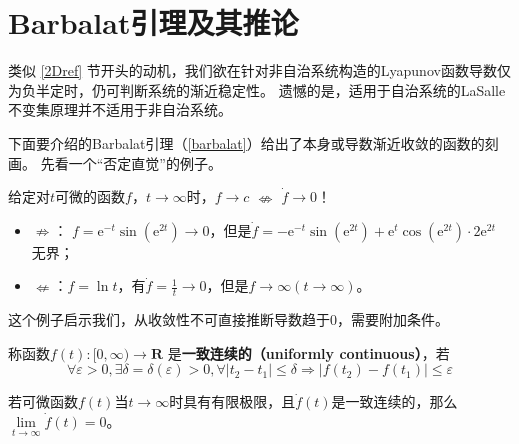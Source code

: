 \section{Barbalat引理及其推论}\label{3Eref}
类似 \ref{2Dref} 节开头的动机，我们欲在针对非自治系统构造的Lyapunov函数导数仅为负半定时，仍可判断系统的渐近稳定性。
遗憾的是，适用于自治系统的LaSalle不变集原理并不适用于非自治系统。

下面要介绍的Barbalat引理（\ref{barbalat}）给出了本身或导数渐近收敛的函数的刻画。
先看一个“否定直觉”的例子。
\begin{example}
    给定对$t$可微的函数$f$，$t \rightarrow \infty$时，$f\to c$  $\nLeftrightarrow $ $\dot{f} \rightarrow 0$！
  \begin{itemize}[leftmargin=1em]
    \item $\nRightarrow $： $f = \mathrm{e}^{- t} \sin (\mathrm{e}^{2 t}) \rightarrow 0$，但是$ \dot{f} = - \mathrm{e}^{- t} \sin
    (\mathrm{e}^{2 t}) + \mathrm{e}^t \cos (\mathrm{e}^{2 t}) \cdot 2 \mathrm{e}^{2 t}$ 无界；    
    \item $\nLeftarrow $：$f = \ln  t$，有$ \dot{f} = \frac{1}{t} \rightarrow0$，但是$f \rightarrow \infty(t \rightarrow \infty)$。
  \end{itemize}
\end{example}
这个例子启示我们，从收敛性不可直接推断导数趋于$0$，需要附加条件。
\begin{definition}
    称函数$f(t) : [0,\infty) \rightarrow \mathbf{R}$ 是{\bf 一致连续的（uniformly continuous）}，若
     \[\forall \varepsilon > 0, \exists \delta
  = \delta (\varepsilon) > 0, \forall | t_2 - t_1 | \leq \delta \Rightarrow |
  f (t_2) - f (t_1) | \leq \varepsilon\]
\end{definition}
\begin{theorem}[Barbalat引理]\label{barbalat}
    若可微函数$f(t)$当$t\to\infty$时具有有限极限，且$\dot{f}(t)$是一致连续的，那么$\lim\limits_{t\to\infty}\dot{f}(t)=0$。
\end{theorem}

